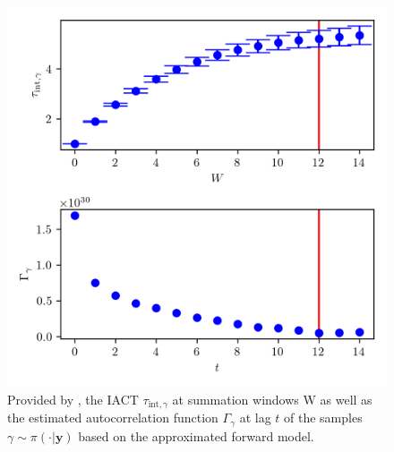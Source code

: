 \begin{figure}[ht!]
	\centering
	\includegraphics{UwerrTauIntSecO3gam.png}
	\caption[IACT and autocorrelation of samples $\gamma \sim \pi( \cdot| \bm{y})$, for approximated model.]{Provided by \cite{drikHesse}, the IACT $\tau_{\text{int},\gamma}$ at summation windows W as well as the estimated autocorrelation function $\Gamma_{\gamma}$ at lag $t$ of the samples $\gamma \sim \pi( \cdot | \bm{y})$ based on the approximated forward model.}
	\label{fig:IATCSecO3gam}
\end{figure}
\clearpage
